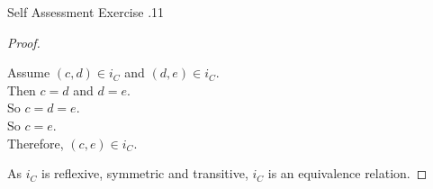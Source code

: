 \documentclass[\main/notes.tex]{subfiles}
\begin{document}
\begin{exercise}{Self Assessment Exercise \thechapter.11}
\begin{questions}
\begin{questions}
\begin{answer}
\begin{proof}
\begin{subproof}[Transitivity]
											Assume $(c, d) \in i_{C}$ and $(d, e) \in i_{C}$.\\
											Then $c = d$ and $d = e$.\\
											So $c = d = e$.\\
											So $c = e$.\\
											Therefore, $(c, e) \in i_{C}$.
										\end{subproof}
										As $i_{C}$ is reflexive, symmetric and transitive, $i_{C}$ is an equivalence relation.
									\end{proof}
								\end{answer}
						\end{questions}
				\end{questions}
			\end{exercise}
\end{document}
